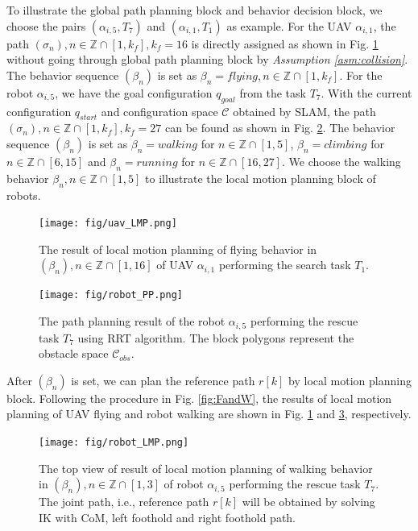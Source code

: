 \documentclass{ieeeaccess}
\begin{document}
To illustrate the global path planning block and behavior decision block, we choose the pairs $(\alpha_{i,5},T_7)$ and $(\alpha_{i,1}, T_1)$ as example. For the UAV $\alpha_{i,1}$, the path $(\sigma_n),n\in\mathbb{Z}\cap[1,k_f],k_f=16$ is directly assigned as shown in Fig. \ref{sim:flying} without going through global path planning block by \textit{Assumption \ref{asm:collision}}. The behavior sequence $(\beta_n)$ is set as $\beta_n=\mathit{flying}, n\in\mathbb{Z}\cap[1,k_f]$. For the robot $\alpha_{i,5}$, we have the goal configuration $q_{goal}$ from the task $T_7$. With the current configuration $q_{start}$ and configuration space $\mathcal{C}$ obtained by SLAM, the path $(\sigma_n),n\in\mathbb{Z}\cap[1,k_f],k_f=27$ can be found as shown in Fig. \ref{fig:R_task}. The behavior sequence $(\beta_n)$ is set as $\beta_n=\mathit{walking}$ for $n\in\mathbb{Z}\cap[1,5]$, $\beta_n=\mathit{climbing}$ for $n\in\mathbb{Z}\cap[6,15]$ and $\beta_n=\mathit{running}$ for $n\in\mathbb{Z}\cap[16,27]$. We choose the walking behavior $\beta_n, n\in\mathbb{Z}\cap[1,5]$ to illustrate the local motion planning block of robots.
\begin{figure}[htbp]
    \centering
    \texttt{[image: fig/uav\_LMP.png]}\caption{The result of local motion planning of flying behavior in $(\beta_n), n\in\mathbb{Z}\cap[1,16]$ of UAV $\alpha_{i,1}$ performing the search task $T_1$.}%
    \label{sim:flying}
\end{figure}
\begin{figure}[htbp]
    \centering
    \texttt{[image: fig/robot\_PP.png]}\caption{The path planning result of the robot $\alpha_{i,5}$ performing the rescue task $T_7$ using RRT algorithm. The block polygons represent the obstacle space $\mathcal{C}_{obs}$.}%
    \label{fig:R_task}
\end{figure}

After $(\beta_n)$ is set, we can plan the reference path $r[k]$ by local motion planning block. Following the procedure in Fig. \ref{fig:FandW}, the results of local motion planning of UAV flying and robot walking are shown in Fig. \ref{sim:flying} and \ref{sim:walking}, respectively.
\begin{figure}[htbp]
    \centering
    \texttt{[image: fig/robot\_LMP.png]}\caption{The top view of result of local motion planning of walking behavior in $(\beta_n), n\in\mathbb{Z}\cap[1,3]$ of robot $\alpha_{i,5}$ performing the rescue task $T_7$. The joint path, i.e., reference path $r[k]$ will be obtained by solving IK with CoM, left foothold and right foothold path.}
    \label{sim:walking}
\end{figure}
\end{document}
